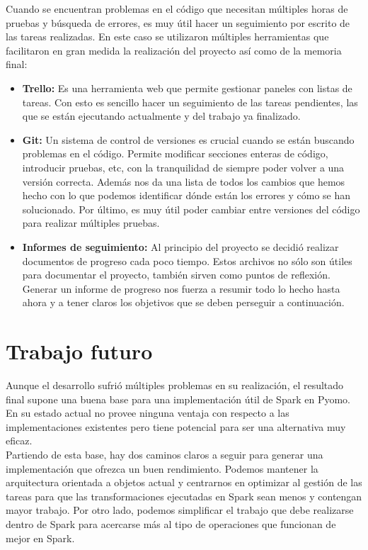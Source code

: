 Cuando se encuentran problemas en el código que necesitan múltiples horas de pruebas y búsqueda de errores, es muy útil hacer un seguimiento por escrito de las tareas realizadas. En este caso se utilizaron múltiples herramientas que facilitaron en gran medida la realización del proyecto así como de la memoria final:

\begin{itemize}
    \item \textbf{Trello: } Es una herramienta web que permite gestionar paneles con listas de tareas. Con esto es sencillo hacer un seguimiento de las tareas pendientes, las que se están ejecutando actualmente y del trabajo ya finalizado.
    \item \textbf{Git: } Un sistema de control de versiones es crucial cuando se están buscando problemas en el código. Permite modificar secciones enteras de código, introducir pruebas, etc, con la tranquilidad de siempre poder volver a una versión correcta. Además nos da una lista de todos los cambios que hemos hecho con lo que podemos identificar dónde están los errores y cómo se han solucionado. Por último, es muy útil poder cambiar entre versiones del código para realizar múltiples pruebas.
    \item \textbf{Informes de seguimiento: } Al principio del proyecto se decidió realizar documentos de progreso cada poco tiempo. Estos archivos no sólo son útiles para documentar el proyecto, también sirven como puntos de reflexión. Generar un informe de progreso nos fuerza a resumir todo lo hecho hasta ahora y a tener claros los objetivos que se deben perseguir a continuación.
\end{itemize}

\section{Trabajo futuro}

Aunque el desarrollo sufrió múltiples problemas en su realización, el resultado final supone una buena base para una implementación útil de Spark en Pyomo. En su estado actual no provee ninguna ventaja con respecto a las implementaciones existentes pero tiene potencial para ser una alternativa muy eficaz. \\

Partiendo de esta base, hay dos caminos claros a seguir para generar una implementación que ofrezca un buen rendimiento. Podemos mantener la arquitectura orientada a objetos actual y centrarnos en optimizar al gestión de las tareas para que las transformaciones ejecutadas en Spark sean menos y contengan mayor trabajo. Por otro lado, podemos simplificar el trabajo que debe realizarse dentro de Spark para acercarse más al tipo de operaciones que funcionan de mejor en Spark.\\

